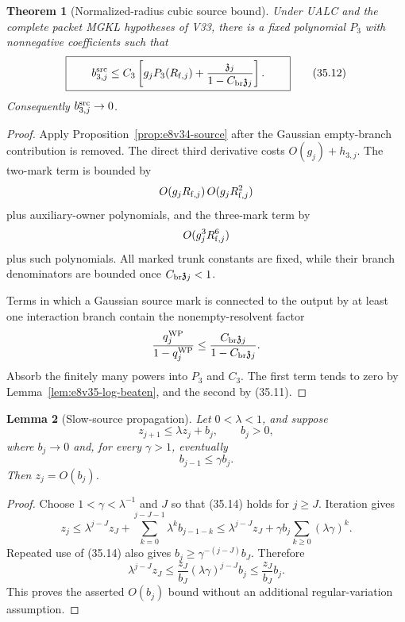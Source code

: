 \documentclass[11pt,oneside]{book}
\newtheorem{theorem}{Theorem}[chapter]
\newtheorem{lemma}[theorem]{Lemma}
\theoremstyle{definition}
\theoremstyle{remark}
\begin{document}
\begin{theorem}[Normalized-radius cubic source bound]
\label{thm:e8v35-cubic-source}
Under UALC and the complete packet MGKL hypotheses of V33, there is a
fixed polynomial \(P_3\) with nonnegative coefficients such that
\[
\boxed{\qquad
 b_{3,j}^{\rm src}
 \leq
 C_3\left[
 g_jP_3(R_{{\rm f},j})
 +\frac{{\mathfrak z}_j}{1-C_{\rm br}{\mathfrak z}_j}
 \right].
\qquad}                                                         \tag{35.12}
\]
Consequently \(b_{3,j}^{\rm src}\to0\).
\end{theorem}

\begin{proof}
Apply Proposition~\ref{prop:e8v34-source} after the Gaussian
empty-branch contribution is removed.  The direct third derivative
costs \(O(g_j)+h_{3,j}\).  The two-mark term is bounded by
\[
 O(g_jR_{{\rm f},j})\,
 O(g_jR_{{\rm f},j}^2)
 \]
plus auxiliary-owner polynomials, and the three-mark term by
\[
 O(g_j^3R_{{\rm f},j}^6)
 \]
plus such polynomials.  All marked trunk constants are fixed, while
their branch denominators are bounded once
\(C_{\rm br}{\mathfrak z}_j<1\).

Terms in which a Gaussian source mark is connected to the output by
at least one interaction branch contain the nonempty-resolvent
factor
\[
 \frac{q_j^{\rm WP}}{1-q_j^{\rm WP}}
 \leq
 \frac{C_{\rm br}{\mathfrak z}_j}
 {1-C_{\rm br}{\mathfrak z}_j}.
\]
Absorb the finitely many powers into \(P_3\) and \(C_3\).  The first
term tends to zero by
Lemma~\ref{lem:e8v35-log-beaten}, and the second by (35.11).
\end{proof}

\begin{lemma}[Slow-source propagation]
\label{lem:e8v35-slow-source}
Let \(0<\lambda<1\), and suppose
\[
 z_{j+1}\leq\lambda z_j+b_j,\qquad b_j>0,                        \tag{35.13}
\]
where \(b_j\to0\) and, for every \(\gamma>1\), eventually
\[
                             b_{j-1}\leq\gamma b_j.               \tag{35.14}
\]
Then \(z_j=O(b_j)\).
\end{lemma}

\begin{proof}
Choose \(1<\gamma<\lambda^{-1}\) and \(J\) so that (35.14) holds for
\(j\geq J\).  Iteration gives
\[
 z_j\leq\lambda^{j-J}z_J+
 \sum_{k=0}^{j-J-1}\lambda^k b_{j-1-k}
 \leq
 \lambda^{j-J}z_J+
 \gamma b_j\sum_{k\geq0}(\lambda\gamma)^k.                       \tag{35.15}
\]
Repeated use of (35.14) also gives
\(b_j\geq\gamma^{-(j-J)}b_J\).  Therefore
\[
 \lambda^{j-J}z_J
 \leq
 \frac{z_J}{b_J}(\lambda\gamma)^{j-J}b_j
 \leq\frac{z_J}{b_J}b_j.
\]
This proves the asserted \(O(b_j)\) bound without an additional
regular-variation assumption.
\end{proof}
\end{document}
